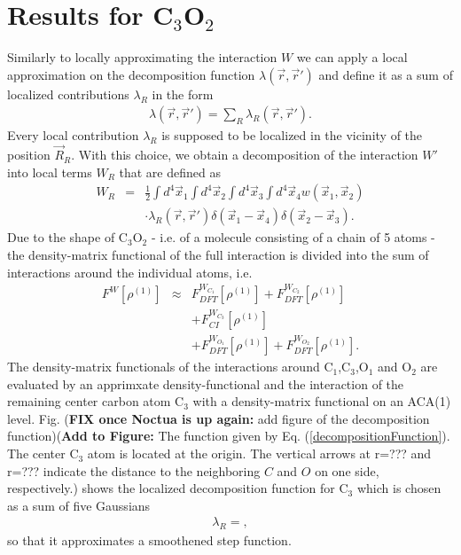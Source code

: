 \documentclass[%
 reprint,
nofootinbib,
 amsmath,amssymb,
 aps,
]{revtex4-2}
\begin{document}
\section{Results for C$_3$O$_2$}
Similarly to locally approximating the interaction $W$ we can apply a local approximation on the decomposition function $\lambda(\Vec{r},\Vec{r}')$ and define it as a sum of localized contributions $\lambda_R$ in the form
\begin{eqnarray}
\lambda(\Vec{r},\Vec{r}') = \sum_R\lambda_R(\Vec{r},\Vec{r}'). \label{localizedLambda}
\end{eqnarray}
Every local contribution $\lambda_R$ is supposed to be localized in the vicinity of the position $\Vec{R}_R$. With this choice, we obtain a decomposition of the interaction $W'$ into local terms $W_R$ that are defined as
\begin{eqnarray}
W_R&=&\frac{1}{2}\int d^4\Vec{x}_1\int d^4\Vec{x}_2\int d^4\Vec{x}_3\int d^4\Vec{x}_4w(\Vec{x}_1,\Vec{x}_2)\nonumber\\
&&\cdot\lambda_R(\Vec{r},\Vec{r}')\delta(\Vec{x}_1-\Vec{x}_4)\delta(\Vec{x}_2-\Vec{x}_3).
\end{eqnarray}
Due to the shape of C$_3$O$_2$ - i.e. of a molecule consisting of a chain of 5 atoms - the density-matrix functional of the full interaction is divided into the sum of interactions around the individual atoms, i.e. 
\begin{eqnarray}
F^W[\rho^{(1)}]&\approx& F^{W_{C_1}}_{DFT}[\rho^{(1)}]+F^{W_{C_2}}_{DFT}[\rho^{(1)}]\nonumber\\
&&+F^{W_{C_3}}_{CI}[\rho^{(1)}]\nonumber\\
&&+F^{W_{O_1}}_{DFT}[\rho^{(1)}]+F^{W_{O_2}}_{DFT}[\rho^{(1)}]. \label{c3o2decompostion}
\end{eqnarray}
The density-matrix functionals of the interactions around C$_1$,C$_3$,O$_1$ and O$_2$ are evaluated by an apprimxate density-functional and the interaction of the remaining center carbon atom C$_3$ with a density-matrix functional on an ACA(1) level.
\break
Fig. (\textbf{FIX once Noctua is up again:} add figure of the decomposition function)(\textbf{Add to Figure:} The function given by Eq. (\ref{decompositionFunction}). The center C$_3$ atom is located at the origin. The vertical arrows at r=??? and r=??? indicate the distance to the neighboring $C$ and $O$ on one side, respectively.) shows the localized decomposition function for C$_3$ which is chosen as a sum of five Gaussians
\begin{eqnarray}
\lambda_R = , \label{decompositionFunction}
\end{eqnarray}
so that it approximates a smoothened step function.
\end{document}
